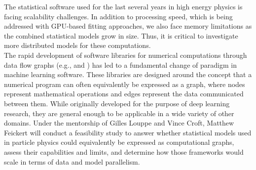 The statistical software used for the last several years in high energy physics is facing scalability challenges.
In addition to processing speed, which is being addressed with GPU-based fitting approaches, we also face memory limitations as the combined statistical models grow in size.
Thus, it is critical to investigate more distributed models for these computations.\\

The rapid development of software libraries for numerical computations through data flow graphs (e.g.,  and ) has led to a fundamental change of paradigm in machine learning software.
These libraries are designed around the concept that a numerical program can often equivalently be expressed as a graph, where nodes represent mathematical operations and edges represent the data communicated between them.
While originally developed for the purpose of deep learning research, they are general enough to be applicable in a wide variety of other domains.
Under the mentorship of Gilles Louppe and Vince Croft, Matthew Feickert will conduct a feasibility study to answer whether statistical models used in particle physics could equivalently be expressed as computational graphs, assess their capabilities and limits, and determine how those frameworks would scale in terms of data and model parallelism.
